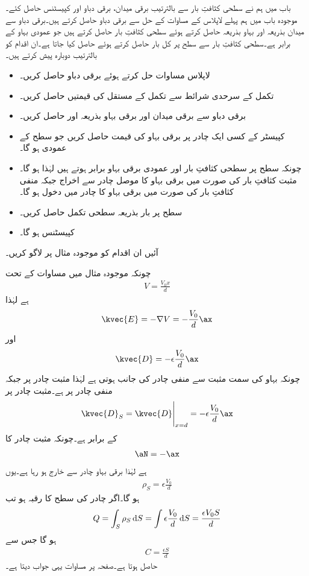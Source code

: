 باب  میں ہم نے سطحی کثافتِ بار سے بالترتیب برقی میدان، برقی دباو اور کپیسٹنس حاصل کئے۔موجودہ باب میں ہم پہلے لاپلاس کے مساوات کے حل سے برقی دباو حاصل کرتے ہیں۔برقی دباو سے میدان بذریعہ   اور بہاو بذریعہ  حاصل کرتے ہوئے سطحی کثافتِ بار حاصل کرتے ہیں جو عمودی بہاو کے برابر ہے۔سطحی کثافتِ بار سے سطح پر کل بار حاصل کرتے ہوئے  حاصل کیا جاتا ہے۔ان اقدام کو بالترتیب دوبارہ پیش کرتے ہیں۔
\begin{itemize}
\item
لاپلاس مساوات حل کرتے ہوئے برقی دباو  حاصل کریں۔
\item
تکمل کے سرحدی شرائط سے تکمل کے مستقل کی قیمتیں حاصل کریں۔
\item
برقی دباو سے برقی میدان اور برقی بہاو  بذریعہ  اور  حاصل کریں۔
\item
کپیسٹر کے کسی ایک چادر پر برقی بہاو کی قیمت  حاصل کریں جو سطح کے عمودی ہو گا۔ 
\item
چونکہ سطح پر سطحی کثافتِ بار اور عمودی برقی بہاو برابر ہوتے ہیں لہٰذا  ہو گا۔مثبت کثافتِ بار کی صورت میں برقی بہاو کا موصل چادر سے اخراج جبکہ منفی کثافتِ بار کی صورت میں برقی بہاو کا چادر میں دخول ہو گا۔
\item
سطح پر بار بذریعہ سطحی تکمل حاصل کریں۔
\item
کپیسٹنس  ہو گا۔
\end{itemize}
آئیں ان اقدام کو موجودہ مثال پر لاگو کریں۔

چونکہ موجودہ مثال میں مساوات  کے تحت
\begin{align*}
V=\frac{V_0x}{d}
\end{align*}
ہے لہٰذا
\begin{align*}
\kvec{E}=-\nabla V=-\frac{V_0}{d}\ax
\end{align*}
اور
\begin{align*}
\kvec{D}=-\epsilon \frac{V_0}{d}\ax
\end{align*}
چونکہ بہاو کی سمت مثبت سے منفی چادر کی جانب ہوتی ہے لہٰذا مثبت چادر  پر جبکہ منفی چادر  پر ہے۔مثبت چادر پر
\begin{align*}
\kvec{D}_S=\eval{\kvec{D}}_{x=d}=-\epsilon \frac{V_0}{d}\ax
\end{align*}
کے برابر ہے۔چونکہ مثبت چادر کا
\begin{align*}
\aN=-\ax
\end{align*}
ہے لہٰذا برقی بہاو چادر سے خارج ہو رہا ہے۔یوں
\begin{align*}
\rho_S=\epsilon \frac{V_0}{d}
\end{align*}
ہو گا۔اگر چادر کی سطح کا رقبہ  ہو تب
\begin{align*}
Q=\int_S \rho_S \dif S=\int \epsilon \frac{V_0}{d} \dif S=\frac{\epsilon V_0 S}{d}
\end{align*}
ہو گا جس سے
\begin{align*}
C=\frac{\epsilon S}{d}
\end{align*}
حاصل ہوتا ہے۔صفحہ  پر مساوات  یہی جواب دیتا ہے۔


